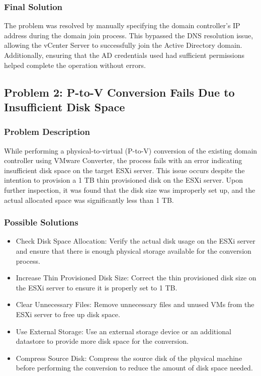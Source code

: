 \documentclass[letterpaper]{article}
\begin{document}
\subsubsection{Final Solution}
\label{sec:orgc60dbbe}
The problem was resolved by manually specifying the domain controller's IP address during the domain join process. This bypassed the DNS resolution issue, allowing the vCenter Server to successfully join the Active Directory domain. Additionally, ensuring that the AD credentials used had sufficient permissions helped complete the operation without errors.

\subsection{Problem 2: P-to-V Conversion Fails Due to Insufficient Disk Space}
\label{sec:orgd12b65e}
\subsubsection{Problem Description}
\label{sec:orge03955d}
While performing a physical-to-virtual (P-to-V) conversion of the existing domain controller using VMware Converter, the process fails with an error indicating insufficient disk space on the target ESXi server. This issue occurs despite the intention to provision a 1 TB thin provisioned disk on the ESXi server. Upon further inspection, it was found that the disk size was improperly set up, and the actual allocated space was significantly less than 1 TB.

\subsubsection{Possible Solutions}
\label{sec:org3de8f6a}
\begin{itemize}
\item Check Disk Space Allocation: Verify the actual disk usage on the ESXi server and ensure that there is enough physical storage available for the conversion process.
\item Increase Thin Provisioned Disk Size: Correct the thin provisioned disk size on the ESXi server to ensure it is properly set to 1 TB.
\item Clear Unnecessary Files: Remove unnecessary files and unused VMs from the ESXi server to free up disk space.
\item Use External Storage: Use an external storage device or an additional datastore to provide more disk space for the conversion.
\item Compress Source Disk: Compress the source disk of the physical machine before performing the conversion to reduce the amount of disk space needed.
\end{itemize}
\end{document}

